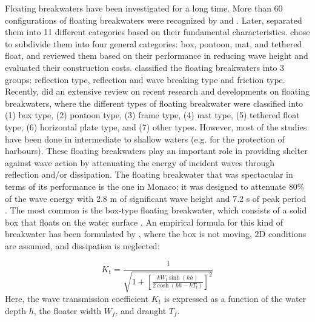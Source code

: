 Floating breakwaters have been investigated for a long time. More than 60 configurations of floating breakwaters were recognized by \citep{jones1971transportable} and \citep{richey1974floating}. Later, \citep{Hales1981} separated them into 11 different categories based on their fundamental characteristics. \citep{McCartney1985} chose to subdivide them into four general categories: box, pontoon, mat, and tethered float, and reviewed them based on their performance in reducing wave height and evaluated their construction costs. \citep{Sawaragi1995} classified the floating breakwaters into 3 groups: reflection type, reflection and wave breaking type and friction type. Recently, \citep{Dai2018} did an extensive review on recent research and developments on floating breakwaters, where the different types of floating breakwater were classified into (1) box type, (2) pontoon type, (3) frame type, (4) mat type, (5) tethered float type, (6) horizontal plate type, and (7) other types. However, most of the studies have been done in intermediate to shallow waters (e.g. for the protection of harbours). These floating breakwaters play an important role in providing shelter against wave action by attenuating the energy of incident waves through reflection and/or dissipation. The floating breakwater that was spectacular in terms of its performance is the one in Monaco; it was designed to attenuate 80\% of the wave energy with 2.8 m of significant wave height and 7.2 s of peak period \citep{Ruggeri2017}. The most common is the box-type floating breakwater, which consists of a solid box that floats on the water surface \citep{McCartney1985}. An empirical formula for this kind of breakwater has been formulated by \citep{macagno1953fluid}, where the box is not moving, 2D conditions are assumed, and dissipation is neglected:

\begin{equation}
    K_{\mathrm{t}}=\frac{1}{\sqrt{1+\left[\frac{k W_{\mathrm{f}} \sinh (k h)}{2 \cosh \left(k h-k T_{\mathrm{f}}\right)}\right]^{2}}}
    \label{eq: macagno1953}
\end{equation}
Here, the wave transmission coefficient $K_t$ is expressed as a function of the water depth $h$, the floater width $W_f$, and draught $T_f$.\\
\\

